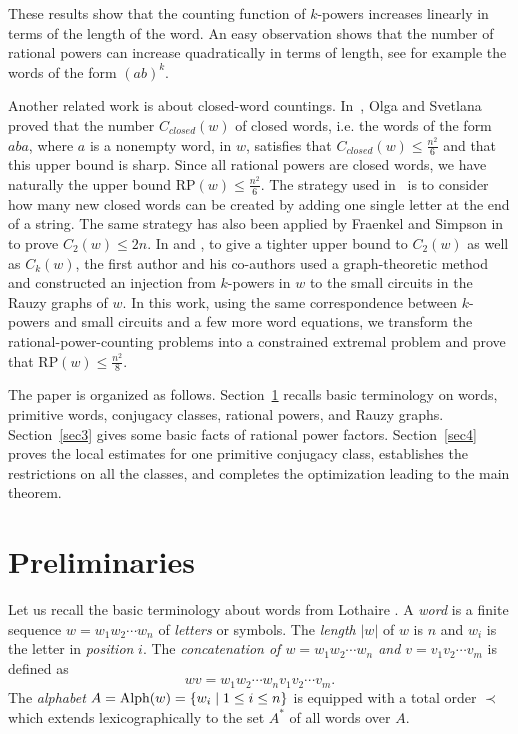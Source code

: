 \documentclass[runningheads,envcountsame,a4paper]{llncs}
\newcommand{\Alphabet}{\hbox{\rm Alph}}
\newcommand{\rp}{\mathrm{RP}}
\begin{document}
These results show that the counting function of $k$-powers increases linearly in terms of the length of the word. An easy observation shows that the number of rational powers can increase quadratically in terms of length, see for example the words of the form $(ab)^k$. 

Another related work is about closed-word countings. In~\cite{OS24}, Olga and Svetlana proved that the number $C_{closed}(w)$ of closed words, i.e. the words of the form $aba$, where $a$ is a nonempty word, in $w$, satisfies that $C_{closed}(w)\leq \frac{n^2}{6}$ and that this upper bound is sharp. Since all rational powers are closed words, we have naturally the upper bound $\rp(w) \leq \frac{n^2}{6}$. The strategy used in~\cite{OS24} is to consider how many new closed words can be created by adding one single letter at the end of a string. The same strategy has also been applied by Fraenkel and Simpson in~\cite{FraenkelS98} to prove $C_2(w) \leq 2n$. In \cite{sq} and \cite{kpower}, to give a tighter upper bound to $C_2(w)$ as well as $C_k(w)$, the first author and his co-authors used a graph-theoretic method and constructed an injection from $k$-powers in $w$ to the small circuits in the Rauzy graphs of $w$. In this work, using the same correspondence between $k$-powers and small circuits and a few more word equations, we transform the rational-power-counting problems into a constrained extremal problem and prove that $\rp(w) \leq \frac{n^2}{8}$. 

The paper is organized as follows. 
Section~\ref{sec2} recalls basic terminology on words, primitive words, conjugacy classes, rational powers, and Rauzy graphs. 
Section~\ref{sec3} gives some basic facts of rational power factors. 
Section~\ref{sec4} proves the local estimates for one primitive conjugacy class, establishes the restrictions on all the classes, and completes the optimization leading to the main theorem.

\section{Preliminaries}\label{sec2}

Let us recall the basic terminology about words from Lothaire \cite{lothaire3}. A {\em word} is a finite sequence   $w = w_1 w_2 \cdots w_{n}$ of \emph{letters} or symbols. The {\em length} $|w|$ of $w$ is $n$ and $w_i$ is the letter in  {\em position} $i$. 
The {\em concatenation of $w= w_1 w_2 \cdots w_{n}$ and $v= v_1 v_2 \cdots v_{m}$} is defined as 
\[wv=w_1 w_2 \cdots w_{n}v_1 v_2 \cdots v_{m}.\] 
The   {\em alphabet} $A= \Alphabet(w)=\left\{w_i \mid 1\leq i \leq n\right\}$ is  equipped with a total order $\prec$ which extends lexicographically to the set $A^*$ of all words over $A$.  
\end{document}
